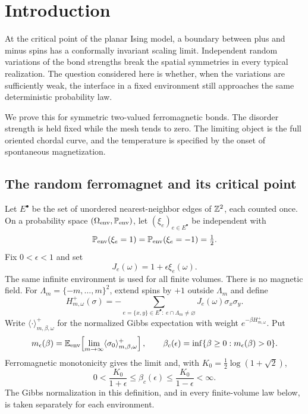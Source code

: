 \section{Introduction}\label{sec:introduction}

At the critical point of the planar Ising model, a boundary between plus
and minus spins has a conformally invariant scaling limit. Independent
random variations of the bond strengths break the spatial symmetries in
every typical realization. The question considered here is whether, when
the variations are sufficiently weak, the interface in a fixed environment
still approaches the same deterministic probability law.

We prove this for symmetric two-valued ferromagnetic bonds. The disorder
strength is held fixed while the mesh tends to zero. The limiting object
is the full oriented chordal curve, and the temperature is specified by
the onset of spontaneous magnetization.

\subsection{The random ferromagnet and its critical point}

Let $E^\bullet$ be the set of unordered nearest-neighbor edges of $\mathbb Z^2$,
each counted once. On a probability space
$(\Omega_{\rm env},\mathbb P_{\rm env})$, let $(\xi_e)_{e\in E^\bullet}$
be independent with
\[
 \mathbb P_{\rm env}(\xi_e=1)=\mathbb P_{\rm env}(\xi_e=-1)=\tfrac12.
\]
Fix $0<\epsilon<1$ and set
\begin{equation}\label{intro:bonds}
 J_e(\omega)=1+\epsilon\xi_e(\omega).
\end{equation}
The same infinite environment is used for all finite volumes. There is
no magnetic field. For $\Lambda_m=\{-m,\ldots,m\}^2$, extend spins by
$+1$ outside $\Lambda_m$ and define
\[
 H^+_{m,\omega}(\sigma)
   =-\sum_{e=\{x,y\}\in E^\bullet:\ e\cap\Lambda_m\ne\varnothing}
                    J_e(\omega)\sigma_x\sigma_y.
\]
Write $\langle\cdot\rangle^+_{m,\beta,\omega}$ for the normalized
Gibbs expectation with weight $e^{-\beta H^+_{m,\omega}}$. Put
\begin{equation}\label{intro:critical-definition}
 m_\epsilon(\beta)
 =\mathbb E_{\rm env}\!\left[\lim_{m\to\infty}
                     \langle\sigma_0\rangle^+_{m,\beta,\omega}\right],
 \qquad
 \beta_c(\epsilon)=\inf\{\beta\ge0:m_\epsilon(\beta)>0\}.
\end{equation}
Ferromagnetic monotonicity gives the limit and, with
$K_0=\tfrac12\log(1+\sqrt2)$,
\begin{equation}\label{intro:critical-bounds}
 0<\frac{K_0}{1+\epsilon}\le\beta_c(\epsilon)
           \le\frac{K_0}{1-\epsilon}<\infty.
\end{equation}
The Gibbs normalization in this definition, and in every finite-volume
law below, is taken separately for each environment.

